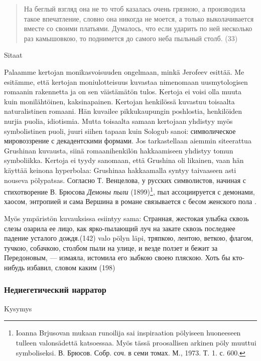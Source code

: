 \documentclass[12pt,a4paper]{article}
\begin{document}
\begin{quote}
На беглый взгляд она не то
чтоб казалась очень грязною, а производила такое впечатление, словно
она никогда не моется, а только выколачивается вместе со своими 
платьями. Думалось, что если ударить по ней несколько раз камышовкою,
то поднимется до самого неба пыльный столб.
(33)
\end{quote}

Sitaat

Palaamme kertojan monikasvoisuuden ongelmaan, minkä Jerofeev esittää. Me esitämme, että kertojan moniulotteisuus kuvastaa nimenomaan uusmytologisen romaanin rakennetta ja on sen väistämätön tulos. Kertoja ei voisi olla muuta kuin monilähtöinen, kaksinapainen. Kertojan henkilössä kuvastuu toisaalta naturalistinen romaani. Hän kuvailee pikkukaupungin poshlostia, henkilöiden nurjia puolia, idiotismia. Mutta toisaalta samaan kertojaan yhdistyy myös symbolistinen puoli, juuri siihen tapaan kuin Sologub sanoi: символическое мировоззрение с декадентскими формами. Jos tarkastellaan aiemmin siteerattua Grushinan kuvausta, siinä romaanihenkilön hakkaamiseen yhdistyy tomun symboliikka. Kertoja ei tyydy sanomaan, että Grushina oli likainen, vaan hän käyttää keinona hyperbolaa: Grushinaa hakkaamalla syntyy taivaaseen asti nouseva pölypatsas. Согласно Т. Венцелова, у русских символистов, начиная с стихотворение В. Брюсова \emph{Демоны пыли} (1899)\footnote{Ioanna Brjusovan mukaan runoilija sai inspiraation pölyiseen huoneeseen tulleen valonsädettä katsoessaa. Myös tässä proosallisen arkinen pöly muuttui symboliseksi. В. Брюсов. Собр. соч. в семи томах. М., 1973. Т. 1. с. 600.}, пыл ассоциируется с демонами, хаосом, энтропией и сама Вершина в романе связывается с бесом женского пола \parencite[42--44]{venclova2012}.

Myös ympäristön kuvauksissa esiintyy sama:
Странная, жестокая улыбка сквозь слезы озарила ее лицо, как 
ярко-пылающий луч на закате сквозь последнее падение усталого дождя.(142) valo pölyn läpi, 
тряпкою, лентою, веткою, флагом, тучкою, собачкою, столбом пыли на улице, и везде ползет и бежит за Передоновым, — измаяла, истомила его зыбкою своею пляскою. Хоть бы кто-нибудь избавил, словом каким (198)




\subsubsection{Недиегетический нарратор}

Kysymys
\end{document}
